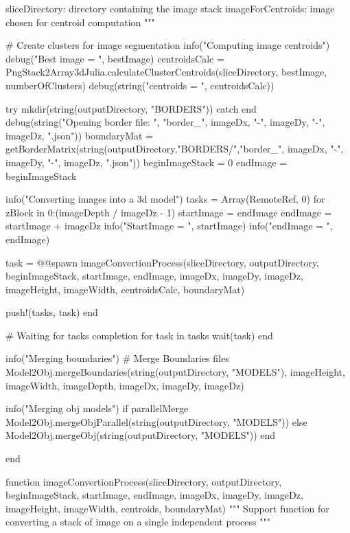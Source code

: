 \documentclass[11pt,oneside]{article}	%
\begin{document}
{  sliceDirectory: directory containing the image stack
  imageForCentroids: image chosen for centroid computation
  """

  # Create clusters for image segmentation
  info("Computing image centroids")
  debug("Best image = ", bestImage)
  centroidsCalc = PngStack2Array3dJulia.calculateClusterCentroids(sliceDirectory, bestImage, numberOfClusters)
  debug(string("centroids = ", centroidsCalc))

  try
    mkdir(string(outputDirectory, "BORDERS"))
  catch
  end
  debug(string("Opening border file: ", "border_", imageDx, "-", imageDy, "-", imageDz, ".json"))
  boundaryMat = getBorderMatrix(string(outputDirectory,"BORDERS/","border_", imageDx, "-",
                                       imageDy, "-", imageDz, ".json"))
  beginImageStack = 0
  endImage = beginImageStack

  info("Converting images into a 3d model")
  tasks = Array(RemoteRef, 0)
  for zBlock in 0:(imageDepth / imageDz - 1)
    startImage = endImage
    endImage = startImage + imageDz
    info("StartImage = ", startImage)
    info("endImage = ", endImage)

    task = @@spawn imageConvertionProcess(sliceDirectory, outputDirectory,
                           beginImageStack, startImage, endImage,
                           imageDx, imageDy, imageDz,
                           imageHeight, imageWidth,
                           centroidsCalc, boundaryMat)

    push!(tasks, task)
  end

  # Waiting for tasks completion
  for task in tasks
    wait(task)
  end

  info("Merging boundaries")
  # Merge Boundaries files
  Model2Obj.mergeBoundaries(string(outputDirectory, "MODELS"),
                            imageHeight, imageWidth, imageDepth,
                            imageDx, imageDy, imageDz)

  info("Merging obj models")
  if parallelMerge
    Model2Obj.mergeObjParallel(string(outputDirectory, "MODELS"))
  else
    Model2Obj.mergeObj(string(outputDirectory, "MODELS"))
  end

end

function imageConvertionProcess(sliceDirectory, outputDirectory,
                                beginImageStack, startImage, endImage,
                                imageDx, imageDy, imageDz,
                                imageHeight, imageWidth,
                                centroids, boundaryMat)
  """
  Support function for converting a stack of image on a single
  independent process
  """

}
\end{document}
